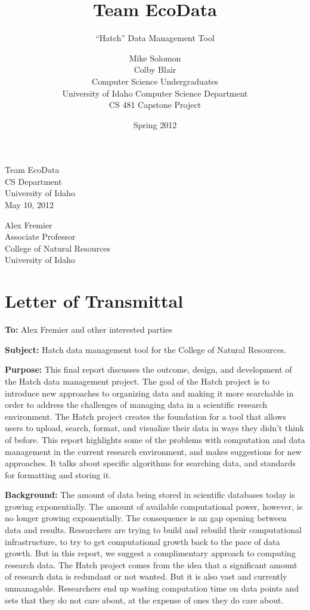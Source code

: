 \documentclass[12pt,letterpaper]{scrartcl}
\date{Spring 2012}
\title{Team EcoData\\
}
\subtitle{``Hatch'' Data Management Tool}
\author{Mike Solomon\\
	Colby Blair \\
	Computer Science Undergraduates \\
	University of Idaho Computer Science Department\\
	CS 481 Capstone Project \\
}
\begin{document}
\begin{flushright}
    Team EcoData \\
    CS Department \\
    University of Idaho \\
    May 10, 2012 \\
\end{flushright}

\noindent
Alex Fremier \\
Associate Professor \\
College of Natural Resources \\
University of Idaho

\section*{Letter of Transmittal}

\textbf{To:} Alex Fremier and other interested parties

\noindent
\textbf{Subject:} Hatch data management tool for the College of Natural Resources.

\textbf{Purpose:} This final report discusses the outcome, design, and development of the Hatch data management project.
The goal of the Hatch project is to introduce new approaches to organizing data and making
it more searchable in order to address the challenges of managing data in a scientific research
environment.
The Hatch project creates the foundation for a tool that allows users to upload, search,
format, and visualize their data in ways they didn't think of before. This report highlights some of the 
problems with computation and data management in the current research environment, and makes 
suggestions for new approaches. It talks about specific algorithms for searching data, and standards for
formatting and storing it.

\textbf{Background:} The amount of data being stored in scientific databases today is growing 
exponentially. The amount of available computational power, however, is no longer growing 
exponentially.
The consequence is an gap opening between data and results. Researchers are trying to build and rebuild
their computational infrastructure, to try to get computational growth back to the pace of data growth.
But in this report, we suggest a complimentary approach to computing research data. The Hatch project
comes from the idea that a significant amount of research data is redundant or not wanted. But it is also
vast and currently unmanagable. Researchers end up wasting computation time on data points and sets
that they do not care about, at the expense of ones they do care about.
\end{document}
